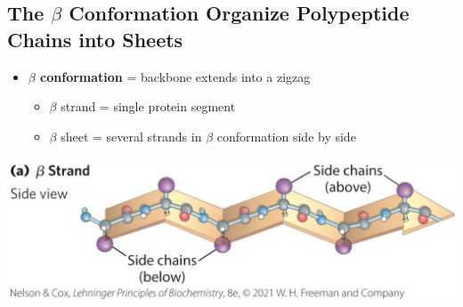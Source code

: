 \documentclass[10pt]{article}
\begin{document}
\subsection*{The $\beta$ Conformation Organize Polypeptide Chains into Sheets}
\begin{itemize}
    \item \textbf{$\beta$ conformation} = backbone extends into a zigzag
    \begin{itemize}
        \item $\beta$ strand = single protein segment
        \item $\beta$ sheet = several strands in $\beta$ conformation side by side
    \end{itemize}
\end{itemize}
\begin{center}
    \includegraphics*[width=\textwidth]{L4_2.png}
\end{center}
\end{document}

